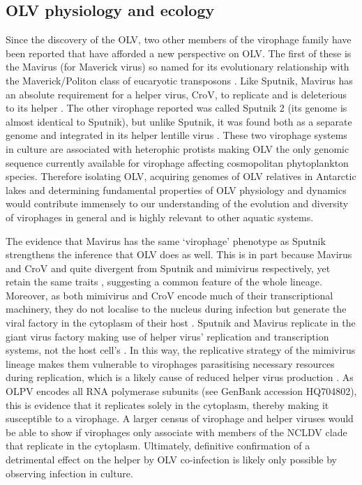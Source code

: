 \subsection{\acs{OLV} physiology and ecology}
Since the discovery of the \ac{OLV}, two other members of the virophage family have been reported that have afforded a new perspective on \ac{OLV}.
The first of these is the Mavirus (for Maverick virus) so named for its evolutionary relationship with the Maverick/Politon class of eucaryotic transposons \cite{Fischer2011a}.
Like Sputnik, Mavirus has an absolute requirement for a helper virus, \ac{CroV}, to replicate and is deleterious to its helper \cite{Fischer2011a}.
The other virophage reported was called Sputnik 2 (its genome is almost identical to Sputnik), but unlike Sputnik, it was found both as a separate genome and integrated in its helper lentille virus \cite{Desnues2012}.
These two virophage systems in culture are associated with heterophic protists making \ac{OLV} the only genomic sequence currently available for virophage affecting cosmopolitan phytoplankton species.
Therefore isolating \ac{OLV}, acquiring genomes of \ac{OLV} relatives in Antarctic lakes and determining fundamental properties of \ac{OLV} physiology and dynamics would contribute immensely to our understanding of the evolution and diversity of virophages in general and is highly relevant to other aquatic systems.

The evidence that Mavirus has the same `virophage' phenotype as Sputnik strengthens the inference that \ac{OLV} does as well.
This is in part because Mavirus and \ac{CroV} and quite divergent from Sputnik and mimivirus respectively, yet retain the same traits \cite{Fischer2010, Fischer2011a}, suggesting a common feature of the whole lineage.
Moreover, as both mimivirus and \ac{CroV} encode much of their transcriptional machinery, they do not localise to the nucleus during infection but generate the viral factory in the cytoplasm of their host \cite{LaScola2008, Fischer2011a}.
Sputnik and Mavirus replicate in the giant virus factory making use of helper virus' replication and transcription systems, not the host cell's \cite{LaScola2008, Claverie2009, Fischer2011a}.
In this way, the replicative strategy of the mimivirus lineage makes them vulnerable to virophages parasitising necessary resources during replication, which is a likely cause of reduced helper virus production \cite{Claverie2009, Fischer2011a, Fischer2011b}.
As \ac{OLPV} encodes all \textsc{RNA} polymerase subunits (see GenBank accession HQ704802), this is evidence that it replicates solely in the cytoplasm, thereby making it susceptible to a virophage.
A larger census of virophage and helper viruses would be able to show if virophages only associate with members of the \ac{NCLDV} clade that replicate in the cytoplasm.
Ultimately, definitive confirmation of a detrimental effect on the helper by \ac{OLV} co-infection is likely only possible by observing infection in culture.

